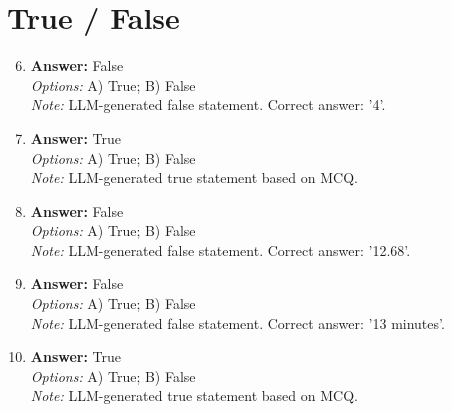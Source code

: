 \documentclass[12pt]{article}
\begin{document}
\section*{True / False}
\begin{enumerate}[label=\arabic*.]
\setcounter{enumi}{5}
\item \textbf{Answer:} False
\\ \textit{Options:} A) True; B) False
\\ \textit{Note:} LLM-generated false statement. Correct answer: '4'.
\item \textbf{Answer:} True
\\ \textit{Options:} A) True; B) False
\\ \textit{Note:} LLM-generated true statement based on MCQ.
\item \textbf{Answer:} False
\\ \textit{Options:} A) True; B) False
\\ \textit{Note:} LLM-generated false statement. Correct answer: '12.68'.
\item \textbf{Answer:} False
\\ \textit{Options:} A) True; B) False
\\ \textit{Note:} LLM-generated false statement. Correct answer: '13 minutes'.
\item \textbf{Answer:} True
\\ \textit{Options:} A) True; B) False
\\ \textit{Note:} LLM-generated true statement based on MCQ.
\end{enumerate}
\end{document}
